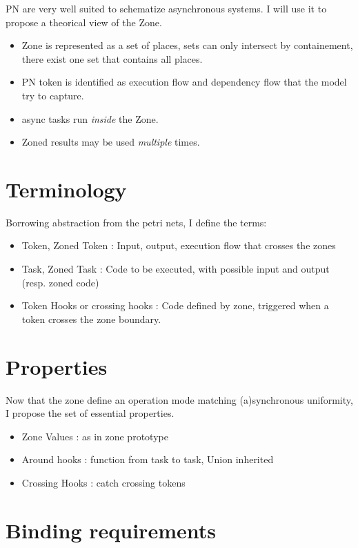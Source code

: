 PN are very well suited to schematize asynchronous systems. I will use it to propose a theorical view of the Zone.

\begin{itemize}
\item Zone is represented as a set of places, sets can only intersect by containement, there exist one set that contains all places.
\item PN token is identified as execution flow and dependency flow that the model try to capture.
\item async tasks run \emph{inside} the Zone.
\item Zoned results may be used \emph{multiple} times.
\end{itemize}

\section{Terminology}

Borrowing abstraction from the petri nets, I define the terms:

\begin{itemize}
\item Token, Zoned Token : Input, output, execution flow that crosses the zones
\item Task, Zoned Task : Code to be executed, with possible input and output (resp. zoned code)
\item Token Hooks or crossing hooks : Code defined by zone, triggered when a token crosses the zone boundary.
\end{itemize}

\section{Properties}

Now that the zone define an operation mode matching (a)synchronous uniformity, I propose the set of essential properties.

\begin{itemize}
\item Zone Values : as in zone prototype
\item Around hooks : function from task to task, Union inherited
\item Crossing Hooks : catch crossing tokens
\end{itemize}

\section{Binding requirements}

